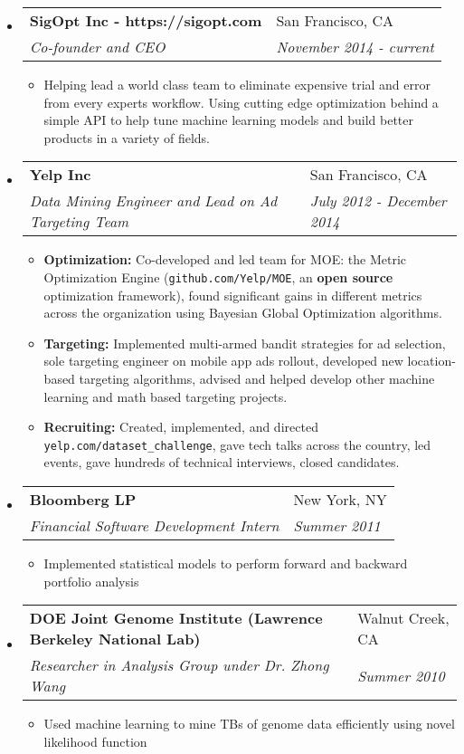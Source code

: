 \documentclass[letterpaper, 11pt]{article}
\makeatletter
\newcommand{\entry}[4]{%
  \begin{tabularx}{\linewidth}{@{}Xl@{}}
    \textbf{#1} & #2          \\
    \textit{#3} & \textit{#4} \\
  \end{tabularx}
}
\makeatother
\begin{document}
\begin{itemize}

\item
	\entry{SigOpt Inc - https://sigopt.com}{San Francisco, CA}{Co-founder and CEO}{November 2014 - current}
	\begin{itemize}
      \item{Helping lead a world class team to eliminate expensive trial and error from every experts workflow. Using cutting edge optimization behind a simple API to help tune machine learning models and build better products in a variety of fields.}
	\end{itemize}

\item
	\entry{Yelp Inc}{San Francisco, CA}{Data Mining Engineer and Lead on Ad Targeting Team}{July 2012 - December 2014}
	\begin{itemize}
            \item{{\bf Optimization:} Co-developed and led team for MOE: the Metric Optimization Engine (\texttt{github.com/Yelp/MOE}, an \textbf{open source} optimization framework), found significant gains in different metrics across the organization using Bayesian Global Optimization algorithms.}
            \item{{\bf Targeting:} Implemented multi-armed bandit strategies for ad selection, sole targeting engineer on mobile app ads rollout, developed new location-based targeting algorithms, advised and helped develop other machine learning and math based targeting projects.}
            \item{{\bf Recruiting:} Created, implemented, and directed \texttt{yelp.com/dataset\_challenge}, gave tech talks across the country, led events, gave hundreds of technical interviews, closed candidates.}
	\end{itemize}

\item
	\entry{Bloomberg LP}{New York, NY}{Financial Software Development Intern}{Summer 2011}
	\begin{itemize}
    \item{Implemented statistical models to perform forward and backward portfolio analysis}
	\end{itemize}

\item
	\entry{DOE Joint Genome Institute (Lawrence Berkeley National Lab)}{Walnut Creek, CA}{Researcher in Analysis Group under Dr. Zhong Wang}{Summer 2010}
	\begin{itemize}
    \item{Used machine learning to mine TBs of genome data efficiently using novel likelihood function}
	\end{itemize}


\end{itemize}
\end{document}
